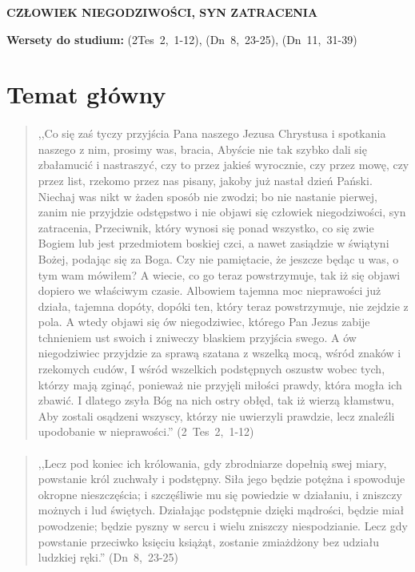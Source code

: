 \documentclass[10pt,a4paper,oneside]{article}
\begin{document}
\centerline{\textbf{\MakeUppercase{Człowiek niegodziwości, syn zatracenia}}}
\begin{center}
\textbf{Wersety do studium:} 
\mbox{(2Tes 2, 1-12)}, \mbox{(Dn 8, 23-25)}, \mbox{(Dn 11, 31-39)}
\end{center}
\section{Temat główny}
\paragraph{}
\begin{quote}
,,Co się zaś tyczy przyjścia Pana naszego Jezusa Chrystusa i spotkania naszego z nim, prosimy was, bracia, Abyście nie tak szybko dali się zbałamucić i nastraszyć, czy to przez jakieś wyrocznie, czy przez mowę, czy przez list, rzekomo przez nas pisany, jakoby już nastał dzień Pański. Niechaj was nikt w żaden sposób nie zwodzi; bo nie nastanie pierwej, zanim nie przyjdzie odstępstwo i nie objawi się człowiek niegodziwości, syn zatracenia, Przeciwnik, który wynosi się ponad wszystko, co się zwie Bogiem lub jest przedmiotem boskiej czci, a nawet zasiądzie w świątyni Bożej, podając się za Boga. Czy nie pamiętacie, że jeszcze będąc u was, o tym wam mówiłem? A wiecie, co go teraz powstrzymuje, tak iż się objawi dopiero we właściwym czasie. Albowiem tajemna moc nieprawości już działa, tajemna dopóty, dopóki ten, który teraz powstrzymuje, nie zejdzie z pola. A wtedy objawi się ów niegodziwiec, którego Pan Jezus zabije tchnieniem ust swoich i zniweczy blaskiem przyjścia swego. A ów niegodziwiec przyjdzie za sprawą szatana z wszelką mocą, wśród znaków i rzekomych cudów, I wśród wszelkich podstępnych oszustw wobec tych, którzy mają zginąć, ponieważ nie przyjęli miłości prawdy, która mogła ich zbawić. I dlatego zsyła Bóg na nich ostry obłęd, tak iż wierzą kłamstwu, Aby zostali osądzeni wszyscy, którzy nie uwierzyli prawdzie, lecz znaleźli upodobanie w nieprawości.'' \mbox{(2 Tes 2, 1-12)}
\end{quote}
\paragraph{}
\begin{quote}
,,Lecz pod koniec ich królowania, gdy zbrodniarze dopełnią swej miary, powstanie król zuchwały i podstępny. Siła jego będzie potężna i spowoduje okropne nieszczęścia; i szczęśliwie mu się powiedzie w działaniu, i zniszczy możnych i lud świętych. Działając podstępnie dzięki mądrości, będzie miał powodzenie; będzie pyszny w sercu i wielu zniszczy niespodzianie. Lecz gdy powstanie przeciwko księciu książąt, zostanie zmiażdżony bez udziału ludzkiej ręki.'' \mbox{(Dn 8, 23-25)}
\end{quote}
\end{document}
